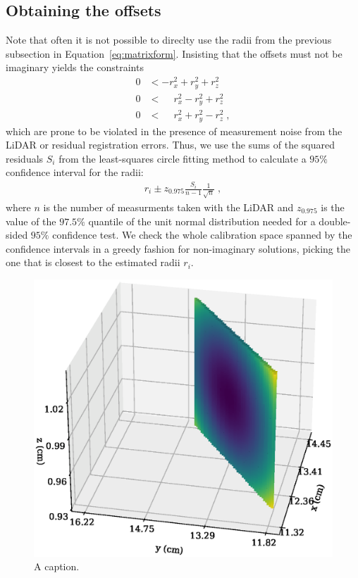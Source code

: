 \subsection{Obtaining the offsets}
Note that often it is not possible to direclty use the radii from the previous subsection in Equation~\eqref{eq:matrixform}.
Insisting that the offsets must not be imaginary yields the constraints
\begin{align}
  0 &< -r_x^2 + r_y^2 + r_z^2 \nonumber \\
  0 &< \phantom{-}r_x^2 - r_y^2 + r_z^2 \nonumber \\
  0 &< \phantom{-}r_x^2 + r_y^2 - r_z^2 \;,
\end{align}
which are prone to be violated in the presence of measurement noise from the LiDAR or residual registration errors.
Thus, we use the sums of the squared residuals $S_i$ from the least-squares circle fitting method to calculate a $95\%$ confidence interval for the radii:
\begin{align}
  r_i \pm z_{0.975} \frac{S_i}{n-1} \frac{1}{\sqrt{n}} \;,
\end{align}
where $n$ is the number of measurments taken with the LiDAR and $z_{0.975}$ is the value of the $97.5\%$ quantile of the unit normal distribution needed for a double-sided $95\%$ confidence test.
We check the whole calibration space spanned by the confidence intervals in a greedy fashion for non-imaginary solutions, picking the one that is closest to the estimated radii $r_i$.
\begin{figure}
  \centering 
  \includegraphics[width=\linewidth]{img/calibspace}
  \caption{A caption.}
  \label{fig:calibspace}
\end{figure}
